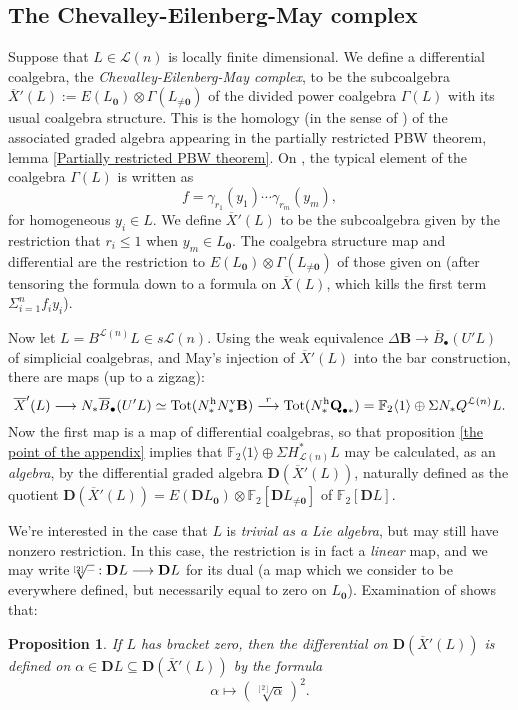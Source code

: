 \documentclass[11pt]{amsart}
\theoremstyle{plain}
\newtheorem{prop}[thm]{Proposition}
\theoremstyle{definition}
\newcommand{\DASH}{\textup{--}}
\renewcommand{\to}{\longrightarrow}
\newcommand{\calL}{\mathcal{L}}
\theoremstyle{plain}
\newcommand{\dualrestn}[1]{\sqrt[{[2]}]{#1}}
\renewcommand{\dualrestn}[1]{\sqrt[{\!\!\![2]}]{#1}}
\newcommand{\UEA}{U'}%
\newcommand{\UEAX}{\overline{X}'}%
\newcommand{\F}{\mathbb{F}}
\newcommand{\dual}{\mathbf{D}}
\begin{document}
\begin{appendices}
\subsection{The Chevalley-Eilenberg-May complex}\label{The Chevalley-Eilenberg-May complex}
Suppose that $L\in\calL(n)$ is locally finite dimensional. We define a differential coalgebra, the \emph{Chevalley-Eilenberg-May complex}, to be the subcoalgebra $\UEAX(L):= E(L_{\textbf{0}})\otimes \Gamma(L_{\neq\textbf{0}})$ of the divided power coalgebra $\Gamma(L)$ with its usual coalgebra structure. This is the homology (in the sense of \cite{PriddyKoszul.pdf}) of the associated graded algebra appearing in the partially restricted PBW theorem, lemma \ref{Partially restricted PBW theorem}. On \cite[p.\ 141]{MayRestLie.pdf}, the typical element of the coalgebra $\Gamma(L)$ is written as 
\[f=\gamma_{r_1}(y_1)\cdots \gamma_{r_m}(y_m),\]
for homogeneous $y_i\in L$. We define $\UEAX(L)$ to be the subcoalgebra given by the restriction that $r_i\leq1$ when $y_m\in L_{\textbf{0}}$. The coalgebra structure map and differential are the restriction to $E(L_{\textbf{0}})\otimes \Gamma(L_{\neq\textbf{0}})$ of those given on \cite[p.\ 141]{MayRestLie.pdf} (after tensoring the formula  \cite[(6.19)]{MayRestLie.pdf} down to a formula on $\overline{X}(L)$, which kills the first term $\Sigma_{i=1}^nf_iy_i$).

Now let $ L=B^{\calL(n)}L\in s\calL(n)$. Using the weak equivalence $\Delta\textbf{B}\to \overline{B}_\bullet(\UEA L)$ of simplicial coalgebras, and  May's injection \cite[Theorem 18 and  (7.8)]{MayRestLie.pdf} of $\UEAX(L)$ into the bar construction, there are maps (up to a zigzag):
\[\UEAX(L)\to N_*\overline{B}_\bullet(U'L)\simeq\textup{Tot}(N^\textup{h}_*N^\textup{v}_*\textbf{B})\overset{r}{\to} \textup{Tot}(N^\textup{h}_*\textbf{Q}_{\bullet*})=\F_2\langle 1\rangle\oplus \Sigma N_*Q^{\calL(n)} L.\]
Now the first map is a map of differential coalgebras, so that proposition \ref{the point of the appendix} implies that $\F_2\langle 1\rangle\oplus \Sigma H^*_{\calL(n)}L$ may be calculated, as an \emph{algebra}, by the differential graded algebra $\dual(\UEAX(L))$, naturally defined as the quotient $\dual(\UEAX(L))=E(\dual L_{\textbf{0}}) \otimes\F_2[\dual L_{\neq\textbf{0}}]$ of $\F_2[\dual L]$.

We're interested in the case that $L$ is \emph{trivial as a Lie algebra}, but may still have nonzero restriction. In this case, the restriction is in fact a \emph{linear} map, and we may write $\dualrestn{\DASH}:\dual L\to \dual L$ for its dual (a map which we consider to be everywhere defined, but necessarily equal to zero on $L_{\textbf{0}}$). Examination of  \cite[(6.19)]{MayRestLie.pdf} shows that:
\begin{prop}
If $L$ has bracket zero, then the differential on $\dual(\UEAX(L))$ is defined on $\alpha\in \dual L\subseteq \dual(\UEAX(L))$ by the formula
\[\alpha\longmapsto (\!\sqrt[{[2]}]{\alpha}\,)^2.\]


\end{prop}
\end{appendices}
\end{document}

